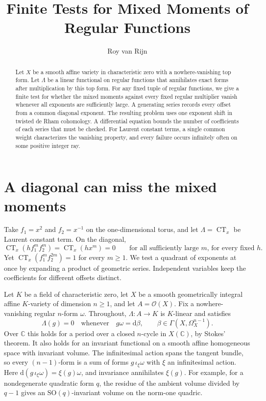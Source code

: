 \documentclass[11pt]{article}
\title{Finite Tests for Mixed Moments of Regular Functions}
\author{Roy van Rijn}
\date{}
\DeclareMathOperator{\CT}{CT}
\newcommand{\A}{\mathcal O}
\newcommand{\dd}{\mathrm d}
\begin{document}
\maketitle

\begin{abstract}
Let \(X\) be a smooth affine variety in characteristic zero with a
nowhere-vanishing top form. Let \(\Lambda\) be a linear functional on
regular functions that annihilates exact forms after multiplication by
this top form. For any fixed tuple of regular functions, we give a
finite test for whether the mixed moments against every fixed regular
multiplier vanish whenever all exponents are sufficiently large.
A generating series records every offset from a common diagonal
exponent. The resulting problem uses one exponent shift in twisted
de Rham cohomology. A differential equation bounds the number of
coefficients of each series that must be checked. For Laurent constant
terms, a single common weight characterizes the vanishing property,
and every failure occurs infinitely often on some positive integer ray.
\end{abstract}

\section{A diagonal can miss the mixed moments}

Take \(f_1=x^2\) and \(f_2=x^{-1}\) on the one-dimensional torus, and
let \(\Lambda=\CT_x\) be Laurent constant term. On the diagonal,
\[
   \CT_x(h f_1^m f_2^m)=\CT_x(hx^m)=0
   \qquad\text{for all sufficiently large \(m\), for every fixed \(h\)}.
\]
Yet \(\CT_x(f_1^m f_2^{2m})=1\) for every \(m\ge1\).
We test a quadrant of exponents at once by expanding a product of
geometric series. Independent variables keep the coefficients for
different offsets distinct.

Let \(K\) be a field of characteristic zero, let \(X\) be a smooth
geometrically integral affine \(K\)-variety of dimension \(n\ge1\),
and let \(A=\A(X)\). Fix a nowhere-vanishing regular \(n\)-form
\(\omega\). Throughout, \(\Lambda:A\to K\) is \(K\)-linear and satisfies
\begin{equation}\label{eq:trace}
 \Lambda(g)=0
 \quad\text{whenever}\quad g\omega=\dd\beta,\qquad
 \beta\in\Gamma(X,\Omega_X^{n-1}).
\end{equation}
Over \(\mathbb C\) this holds for a period over a closed \(n\)-cycle
in \(X(\mathbb C)\), by Stokes' theorem. It also holds for an
invariant functional on a smooth affine
homogeneous space with invariant volume. The infinitesimal action
spans the tangent bundle, so every \((n-1)\)-form is a sum of forms
\(g\,\iota_\xi\omega\) with \(\xi\) an infinitesimal action.
Here \(\dd(g\,\iota_\xi\omega)=\xi(g)\omega\), and invariance
annihilates \(\xi(g)\). For example, for a nondegenerate quadratic
form \(q\), the residue of the ambient volume divided by \(q-1\)
gives an \(\mathrm{SO}(q)\)-invariant volume on the norm-one quadric.
\end{document}
